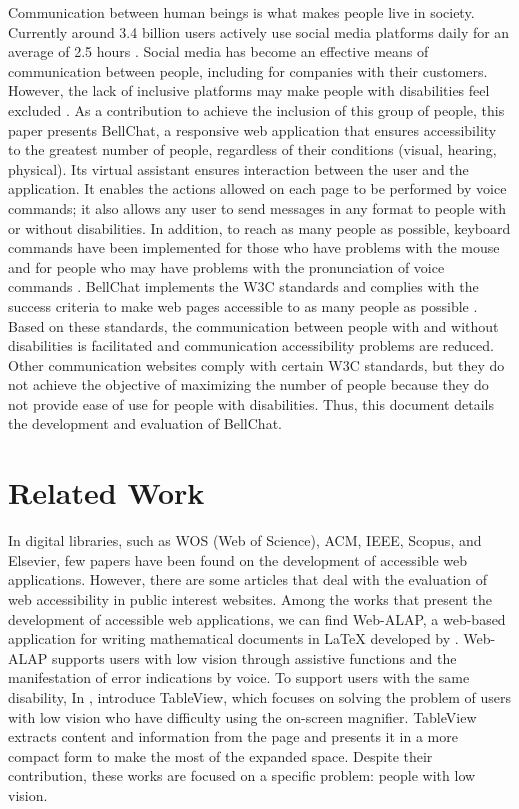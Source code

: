 \documentclass{svproc}
\begin{document}
Communication between human beings is what makes people live in society. Currently around 3.4 billion users actively use social media platforms daily for an average of 2.5 hours \cite{Arya2022}. Social media has become an effective means of communication between people, including for companies with their customers. However, the lack of inclusive platforms may make people with disabilities feel excluded \cite{Arora-Jonsson1687809}. As a contribution to achieve the inclusion of this group of people, this paper presents BellChat, a responsive web application that ensures accessibility to the greatest number of people, regardless of their conditions (visual, hearing, physical). Its virtual assistant ensures interaction between the user and the application. It enables the actions allowed on each page to be performed by voice commands; it also allows any user to send messages in any format to people with or without disabilities. In addition, to reach as many people as possible, keyboard commands have been implemented for those who have problems with the mouse and for people who may have problems with the pronunciation of voice commands \cite{OnayDurdu2022,Wang2017}.
BellChat implements the W3C standards and complies with the success criteria to make web pages accessible to as many people as possible \cite{WCAG202012}. Based on these standards, the communication between people with and without disabilities is facilitated and communication accessibility problems are reduced. Other communication websites comply with certain W3C standards, but they do not achieve the objective of maximizing the number of people because they do not provide ease of use for people with disabilities. Thus, this document details the development and evaluation of BellChat.

\section{Related Work}

In digital libraries, such as WOS (Web of Science), ACM, IEEE, Scopus, and Elsevier, few papers have been found on the development of accessible web applications. However, there are some articles that deal with the evaluation of web accessibility in public interest websites.
Among the works that present the development of accessible web applications, we can find Web-ALAP, a web-based application for writing mathematical documents in LaTeX developed by  \cite{Arooj2020}. Web-ALAP supports users with low vision through assistive functions and the manifestation of error indications by voice. To support users with the same disability, In \cite{Lee2020}, introduce TableView, which focuses on solving the problem of users with low vision who have difficulty using the on-screen magnifier. TableView extracts content and information from the page and presents it in a more compact form to make the most of the expanded space. Despite their contribution, these works are focused on a specific problem: people with low vision.
\end{document}
